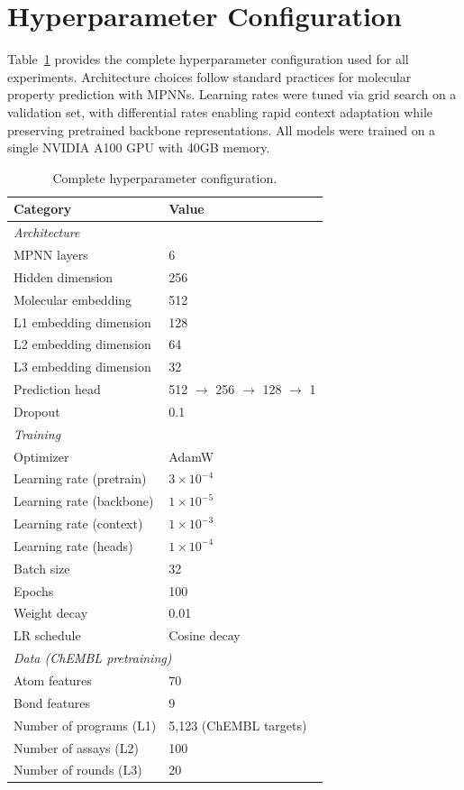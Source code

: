 \documentclass[sigconf,anonymous]{acmart}
\begin{document}
\section{Hyperparameter Configuration}
\label{app:hyperparams}

Table~\ref{tab:hyperparams} provides the complete hyperparameter configuration used for all experiments. Architecture choices follow standard practices for molecular property prediction with MPNNs. Learning rates were tuned via grid search on a validation set, with differential rates enabling rapid context adaptation while preserving pretrained backbone representations. All models were trained on a single NVIDIA A100 GPU with 40GB memory.

\begin{table}[H]
\caption{Complete hyperparameter configuration.}
\label{tab:hyperparams}
\centering
\small
\begin{tabular}{@{}ll@{}}
\toprule
\textbf{Category} & \textbf{Value} \\
\midrule
\multicolumn{2}{l}{\textit{Architecture}} \\
\quad MPNN layers & 6 \\
\quad Hidden dimension & 256 \\
\quad Molecular embedding & 512 \\
\quad L1 embedding dimension & 128 \\
\quad L2 embedding dimension & 64 \\
\quad L3 embedding dimension & 32 \\
\quad Prediction head & 512 $\rightarrow$ 256 $\rightarrow$ 128 $\rightarrow$ 1 \\
\quad Dropout & 0.1 \\
\midrule
\multicolumn{2}{l}{\textit{Training}} \\
\quad Optimizer & AdamW \\
\quad Learning rate (pretrain) & $3 \times 10^{-4}$ \\
\quad Learning rate (backbone) & $1 \times 10^{-5}$ \\
\quad Learning rate (context) & $1 \times 10^{-3}$ \\
\quad Learning rate (heads) & $1 \times 10^{-4}$ \\
\quad Batch size & 32 \\
\quad Epochs & 100 \\
\quad Weight decay & 0.01 \\
\quad LR schedule & Cosine decay \\
\midrule
\multicolumn{2}{l}{\textit{Data (ChEMBL pretraining)}} \\
\quad Atom features & 70 \\
\quad Bond features & 9 \\
\quad Number of programs (L1) & 5,123 (ChEMBL targets) \\
\quad Number of assays (L2) & 100 \\
\quad Number of rounds (L3) & 20 \\
\bottomrule
\end{tabular}
\end{table}
\end{document}

